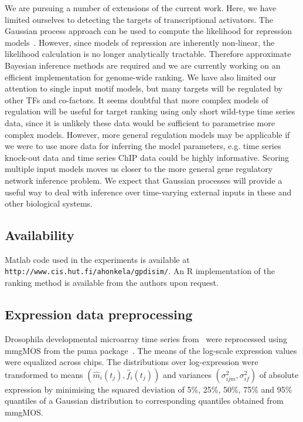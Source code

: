 \documentclass{pnastwo}
\begin{document}
\begin{article}
We are pursuing a number of extensions of the current work. Here, we
have limited ourselves to detecting the targets of transcriptional activators. The
Gaussian process approach can be used to compute the likelihood for
repression models~\cite{Gao2008}. However, since models of repression
are inherently non-linear, the likelihood calculation is no longer analytically
tractable. Therefore approximate Bayesian inference methods are
required and we are currently working on an efficient implementation
for genome-wide ranking. We have also limited our attention
to single input motif models, but many targets will be regulated by other TFs and
co-factors. It seems doubtful that more complex models of regulation
will be useful for target ranking using only short wild-type time
series data, since it is unlikely these data would be sufficient to parametrise more complex models. However,
more general regulation models may be applicable if we were to use more data for
inferring the model parameters, e.g. time series knock-out data and time series
ChIP data could be highly informative. Scoring multiple input
models moves us closer to the more general gene regulatory network inference
problem. We expect that Gaussian processes will provide a useful way
to deal with inference over time-varying external inputs in these and other
biological systems.

\subsection{Availability}
Matlab code used in the experiments is available at
\texttt{http://www.cis.hut.fi/ahonkela/gpdisim/}.  An R implementation of
the ranking method is available from the authors upon request.

\begin{materials}
  \section{Expression data preprocessing} Drosophila developmental
  microarray time series from~\cite{Tomancak2002} were reprocessed
  using mmgMOS from the puma package~\cite{Pearson2009}.  The means of
  the log-scale expression values were equalized across chips.  The
  distributions over log-expression were transformed to means
  $\left(\hat{m}_i(t_j), \hat{f}_i(t_j)\right)$ and variances $\left(\sigma_{ijm}^2,
  \sigma_{if}^2 \right)$ of absolute expression by minimising the squared
  deviation of 5\%, 25\%, 50\%, 75\% and 95\% quantiles of a Gaussian
  distribution to corresponding quantiles obtained from mmgMOS.


\end{materials}
\end{article}
\end{document}
